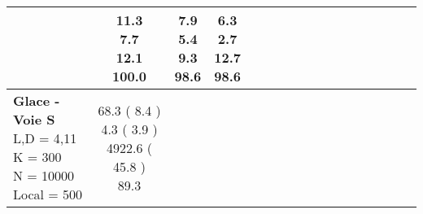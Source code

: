 \documentclass[9pt]{article}
\begin{document}
\begin{landscape}
\begin{longtable}{ l | c c c c | c c c c | c c c c | c c c c |}
             &
                            \makecell{              11.3
     \\
            {\footnotesize             7.7
    } \\  {\footnotesize             12.1
     } \\
            {\small \textcolor[rgb]{ 0.2 , 0.7 , 0.1} {100.0  }
} }
             &                         \makecell{              7.9
     \\
            {\footnotesize             5.4
    } \\  {\footnotesize             9.3
     } \\
            {\small \textcolor[rgb]{ 0.228 , 0.672 , 0.1} {98.6  }
} }
             &
                            \makecell{              6.3
     \\
            {\footnotesize             \textbf{ 2.7 }
    } \\  {\footnotesize             12.7
     } \\
            {\small \textcolor[rgb]{ 0.228 , 0.672 , 0.1} {98.6  }
} }
            

 \\
                                                            
                    \hline
                    \makecell{ \textbf{ Glace - Voie S} \\
                    { \small L,D = 4,11} \\
                    {\small K = 300} \\
                    {\small N = 10000 } \\ {\small Local = 500 }} &
                    
                            \makecell{              68.3
     (             8.4
    ) \\
            {\footnotesize             4.3
     (              3.9
     )} \\
            {\footnotesize             4922.6
     (            45.8
    ) } \\
            {\small  \textcolor[rgb]{ 0.414 , 0.486 , 0.1} {89.3  }
} }



\end{longtable}
\end{landscape}
\end{document}
